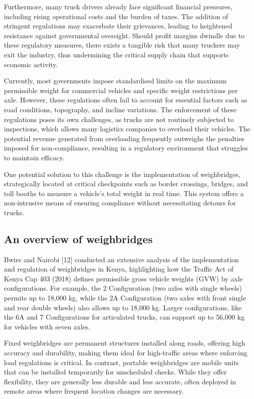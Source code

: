 \vspace{0.5\baselineskip}

Furthermore, many truck drivers already face significant financial pressures, including rising operational costs and the burden of taxes. The addition of stringent regulations may exacerbate their grievances, leading to heightened resistance against governmental oversight. Should profit margins dwindle due to these regulatory measures, there exists a tangible risk that many truckers may exit the industry, thus undermining the critical supply chain that supports economic activity.

Currently, most governments impose standardised limits on the maximum permissible weight for commercial vehicles and specific weight restrictions per axle. However, these regulations often fail to account for essential factors such as road conditions, topography, and incline variations. The enforcement of these regulations poses its own challenges, as trucks are not routinely subjected to inspections, which allows many logistics companies to overload their vehicles. The potential revenue generated from overloading frequently outweighs the penalties imposed for non-compliance, resulting in a regulatory environment that struggles to maintain efficacy.

One potential solution to this challenge is the implementation of weighbridges, strategically located at critical checkpoints such as border crossings, bridges, and toll booths to measure a vehicle’s total weight in real time. This system offers a non-intrusive means of ensuring compliance without necessitating detours for trucks. 

\subsection{An overview of weighbridges}

Bwire and Nairobi [12] conducted an extensive analysis of the implementation and regulation of weighbridges in Kenya, highlighting how the Traffic Act of Kenya Cap 403 (2018) defines permissible gross vehicle weights (GVW) by axle configurations. For example, the 2 Configuration (two axles with single wheels) permits up to 18,000 kg, while the 2A Configuration (two axles with front single and rear double wheels) also allows up to 18,000 kg. Larger configurations, like the 6A and 7 Configurations for articulated trucks, can support up to 56,000 kg for vehicles with seven axles. 

Fixed weighbridges are permanent structures installed along roads, offering high accuracy and durability, making them ideal for high-traffic areas where enforcing load regulations is critical. In contrast, portable weighbridges are mobile units that can be installed temporarily for unscheduled checks. While they offer flexibility, they are generally less durable and less accurate, often deployed in remote areas where frequent location changes are necessary.

